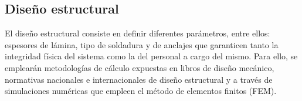 \subsection{Dise\~no estructural}

\noindent
\justify

El dise\~no estructural consiste en definir diferentes par\'ametros, entre ellos: espesores de l\'amina, tipo de soldadura y de anclajes que garanticen tanto la integridad f\'isica del sistema como la del personal a cargo del mismo. Para ello, se emplear\'an metodolog\'ias de c\'alculo expuestas en libros de dise\~no mec\'anico, normativas nacionales e internacionales de dise\~no estructural y a trav\'es de simulaciones num\'ericas que empleen el m\'etodo de elementos finitos (FEM).